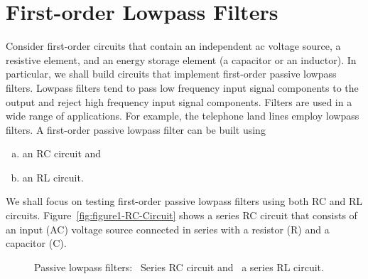   \section{First-order Lowpass Filters}
\label{sec:first-order-lowpass}
Consider first-order circuits that contain an independent ac voltage source, a resistive element, and an energy storage element (a capacitor or an inductor). In particular, we shall build circuits that implement  first-order passive lowpass filters. Lowpass filters tend to pass low frequency input signal  components to the output and reject high frequency input signal components. Filters are used in a wide range of applications. For example, the telephone land lines employ lowpass filters.  A first-order passive lowpass filter can be built using %
%
\begin{enumerate}[a)]
\item an RC circuit and
  
\item an RL circuit. 
\end{enumerate}
%
We shall focus on testing first-order passive lowpass filters using both RC and RL circuits. Figure~\ref{fig:figure1-RC-Circuit} shows a series RC circuit that consists of an input (AC) voltage source connected in series with a resistor (R) and a capacitor (C).  %
%
\begin{figure}
  \centering
  \caption{Passive lowpass filters:~ Series RC circuit and~ a series RL circuit.}
  \label{fig:passiveLPF}
\end{figure}
